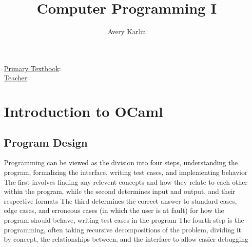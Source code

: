 \documentclass[11 pt, twoside]{article}
\newenvironment{outline*}
{
	\begin{outline}[enumerate]
	}
	{\end{outline}
}
\begin{document}
\title{Computer Programming I}
\author{Avery Karlin}
\date{}
\newcommand{\textbook}{}
\newcommand{\teacher}{}

\maketitle
\newpage
\hypertarget{content}{\tableofcontents}
\vspace{11pt}
\noindent
\underline{Primary Textbook}: \textbook\\
\underline{Teacher}: \teacher
\newpage

\section{Introduction to OCaml}
\subsection{Program Design}
\begin{outline*}
\1 Programming can be viewed as the division into four steps, understanding the program, formalizing the interface, writing test cases, and implementing behavior
\2 The first involves finding any relevent concepts and how they relate to each other within the program, while the second determines input and output, and their respective formats
\2 The third determines the correct answer to standard cases, edge cases, and erroneous cases (in which the user is at fault) for how the program should behave, writing test cases in the program
\2 The fourth step is the programming, often taking recursive decompositions of the problem, dividing it by concept, the relationships between, and the interface to allow easier debugging
\end{outline*}
\end{document}
